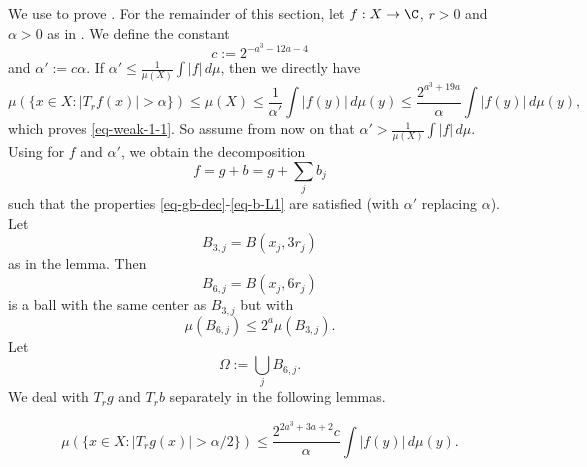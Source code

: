 We use  to prove . For the remainder of this section, let $f:X\to\C$, $r>0$ and $\alpha>0$ as in .
We define the constant
\begin{equation} \label{weak-1-1-proof-cz-const}
    c:= 2^{-a^3-12a-4}
\end{equation}
and $\alpha' := c\alpha$. If $\alpha'\le\frac{1}{\mu(X)}\int |f|\,d\mu$, then we directly have
\begin{equation*}
    \mu\left(\{x\in X: |T_r f(x)|>\alpha\}\right)\le \mu(X) \le \frac{1}{\alpha'} \int |f(y)|\, d\mu(y)
    \le \frac{2^{a^3 + 19a}}{\alpha} \int |f(y)|\, d\mu(y),
\end{equation*}
which proves \eqref{eq-weak-1-1}.
So assume from now on that $\alpha'>\frac{1}{\mu(X)}\int |f|\,d\mu$.
Using  for $f$ and $\alpha'$, we obtain the decomposition
\begin{equation*}
    f=g+b=g+\sum_j b_j
\end{equation*}
such that the properties \eqref{eq-gb-dec}-\eqref{eq-b-L1} are satisfied (with $\alpha'$ replacing $\alpha$). Let
\begin{equation}
    \label{eq-Ij-cj}
    B_{3,j}=B(x_j, 3r_j)
\end{equation}
as in the lemma. Then
\begin{equation}
    \label{eq-Ij*}
    B_{6,j}=B(x_j, 6r_j)
\end{equation}
is a ball with the same center as $B_{3,j}$ but with
\begin{equation}
    \label{eq-Ij*-dim}
    \mu(B_{6,j})\le 2^{a} \mu(B_{3,j}).
\end{equation}
Let
\begin{equation}
    \label{eq-omega}
    \Omega:=\bigcup_j B_{6,j}.
\end{equation}
We deal with $T_rg$ and $T_rb$ separately in the following lemmas.

\begin{lemma}
    \label{estimate-good}
    \leanok
    \begin{equation*}
        \mu\left(\{x\in X: |T_r g(x)|>{\alpha}/2\}\right)
        \le \frac{2^{2a^3+3a+2}c}{\alpha} \int |f(y)|\, d\mu(y).
    \end{equation*}

\end{lemma}

